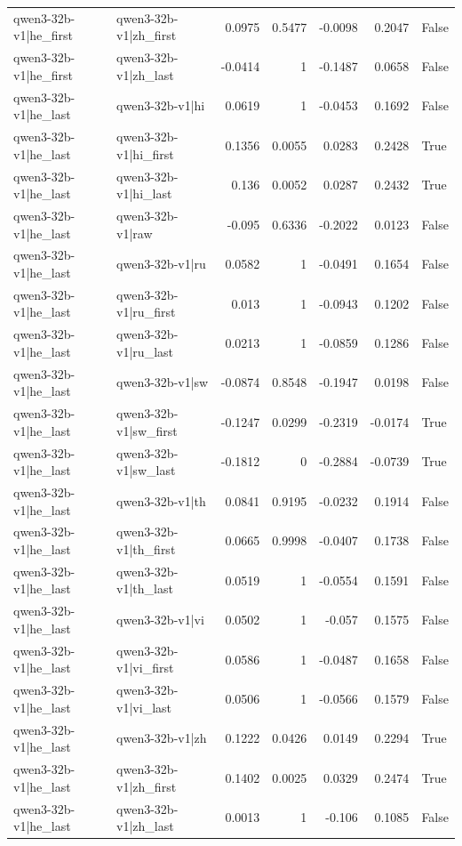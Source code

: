 \begin{table}
\begin{tabular}{l l r r r r l}
qwen3-32b-v1|he_first & qwen3-32b-v1|zh_first & 0.0975 & 0.5477 & -0.0098 & 0.2047 & False \\
qwen3-32b-v1|he_first & qwen3-32b-v1|zh_last & -0.0414 & 1 & -0.1487 & 0.0658 & False \\
qwen3-32b-v1|he_last & qwen3-32b-v1|hi & 0.0619 & 1 & -0.0453 & 0.1692 & False \\
qwen3-32b-v1|he_last & qwen3-32b-v1|hi_first & 0.1356 & 0.0055 & 0.0283 & 0.2428 & True \\
qwen3-32b-v1|he_last & qwen3-32b-v1|hi_last & 0.136 & 0.0052 & 0.0287 & 0.2432 & True \\
qwen3-32b-v1|he_last & qwen3-32b-v1|raw & -0.095 & 0.6336 & -0.2022 & 0.0123 & False \\
qwen3-32b-v1|he_last & qwen3-32b-v1|ru & 0.0582 & 1 & -0.0491 & 0.1654 & False \\
qwen3-32b-v1|he_last & qwen3-32b-v1|ru_first & 0.013 & 1 & -0.0943 & 0.1202 & False \\
qwen3-32b-v1|he_last & qwen3-32b-v1|ru_last & 0.0213 & 1 & -0.0859 & 0.1286 & False \\
qwen3-32b-v1|he_last & qwen3-32b-v1|sw & -0.0874 & 0.8548 & -0.1947 & 0.0198 & False \\
qwen3-32b-v1|he_last & qwen3-32b-v1|sw_first & -0.1247 & 0.0299 & -0.2319 & -0.0174 & True \\
qwen3-32b-v1|he_last & qwen3-32b-v1|sw_last & -0.1812 & 0 & -0.2884 & -0.0739 & True \\
qwen3-32b-v1|he_last & qwen3-32b-v1|th & 0.0841 & 0.9195 & -0.0232 & 0.1914 & False \\
qwen3-32b-v1|he_last & qwen3-32b-v1|th_first & 0.0665 & 0.9998 & -0.0407 & 0.1738 & False \\
qwen3-32b-v1|he_last & qwen3-32b-v1|th_last & 0.0519 & 1 & -0.0554 & 0.1591 & False \\
qwen3-32b-v1|he_last & qwen3-32b-v1|vi & 0.0502 & 1 & -0.057 & 0.1575 & False \\
qwen3-32b-v1|he_last & qwen3-32b-v1|vi_first & 0.0586 & 1 & -0.0487 & 0.1658 & False \\
qwen3-32b-v1|he_last & qwen3-32b-v1|vi_last & 0.0506 & 1 & -0.0566 & 0.1579 & False \\
qwen3-32b-v1|he_last & qwen3-32b-v1|zh & 0.1222 & 0.0426 & 0.0149 & 0.2294 & True \\
qwen3-32b-v1|he_last & qwen3-32b-v1|zh_first & 0.1402 & 0.0025 & 0.0329 & 0.2474 & True \\
qwen3-32b-v1|he_last & qwen3-32b-v1|zh_last & 0.0013 & 1 & -0.106 & 0.1085 & False \\

\end{tabular}
\end{table}
